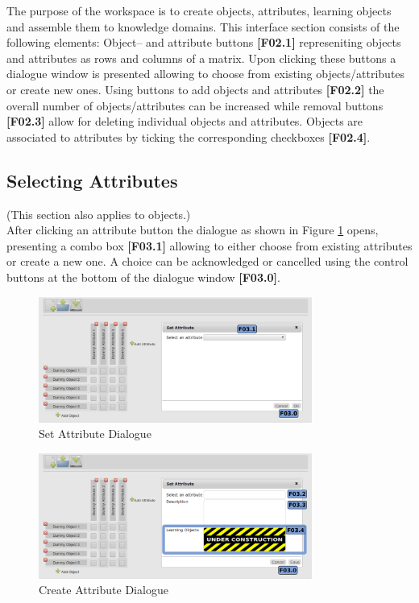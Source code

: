 \documentclass[a4paper,11pt]{article}
\begin{document}
The purpose of the workspace is to create objects, attributes, learning objects and assemble them to knowledge domains. This interface section consists of the following elements:
Object-- and attribute buttons \textbf{[F02.1]}  represeniting objects and attributes as rows and columns of a matrix. Upon clicking these buttons a dialogue window is presented allowing to choose from existing objects/attributes or create new ones. Using
  buttons to add objects and attributes \textbf{[F02.2]} the overall number of objects/attributes can be increased while
  removal buttons \textbf{[F02.3]} allow for deleting individual objects and attributes.
  Objects are associated to attributes by ticking the corresponding
  checkboxes \textbf{[F02.4]}.
  
\subsection{Selecting Attributes}
(This section also applies to objects.)\\
After clicking an attribute button the dialogue as shown in Figure \ref{fig:fca-attr-set} opens, presenting a combo box \textbf{[F03.1]} allowing to either choose from existing attributes or create a new one. A choice can be acknowledged or cancelled using the control buttons at the bottom of the dialogue window \textbf{[F03.0]}.
%
\begin{figure}[h]
\begin{center}
\includegraphics[width=0.8\textwidth]{figures/attr_sel}  
\end{center}
\caption{Set Attribute Dialogue}
\label{fig:fca-attr-set}
\end{figure}
\begin{figure}[h]
\begin{center}
\includegraphics[width=0.8\textwidth]{figures/attr_new}  
\end{center}
\caption{Create Attribute Dialogue}
\label{fig:fca-attr-new}
\end{figure}
%
\end{document}
